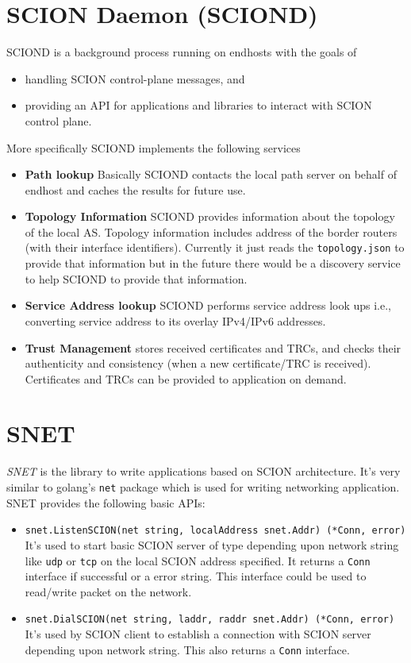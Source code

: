 \section{SCION Daemon (SCIOND)}
SCIOND is a background process running on endhosts with the goals of
\begin{itemize}
    \item handling SCION control-plane messages, and
    \item providing an API for applications and libraries to interact with SCION control plane.
\end{itemize}
More specifically SCIOND implements the following services
\begin{itemize}
    \item \textbf{Path lookup} Basically SCIOND contacts the local path server on behalf of endhost and caches the results for future use.
    \item \textbf{Topology Information} SCIOND provides information about the topology of the local AS. Topology information includes address of the border routers (with their interface identifiers). Currently it just reads the \texttt{topology.json} to provide that information but in the future there would be a discovery service to help SCIOND to provide that information.
    \item \textbf{Service Address lookup} SCIOND performs service address look ups i.e., converting service address to its overlay IPv4/IPv6 addresses.
    \item \textbf{Trust Management} stores received certificates and TRCs, and checks their authenticity and consistency (when a new certificate/TRC is received). Certificates and TRCs can be provided to application on demand.
\end{itemize}

\section{SNET}
\textit{SNET} is the library to write applications based on SCION architecture. It's very similar to golang's \texttt{net} package which is used for writing networking application. SNET provides the following basic APIs:
\begin{itemize}
    \item \texttt{snet.ListenSCION(net string, localAddress snet.Addr) (*Conn, error)} \\
    It's used to start basic SCION server of type depending upon network string like \texttt{udp} or \texttt{tcp} on the local SCION address specified. It returns a \texttt{Conn} interface if successful or a error string. This interface could be used to read/write packet on the network.
    \item \texttt{snet.DialSCION(net string, laddr, raddr snet.Addr) (*Conn, error)}
    It's used by SCION client to establish a connection with SCION server depending upon network string. This also returns a \texttt{Conn} interface.
\end{itemize}

